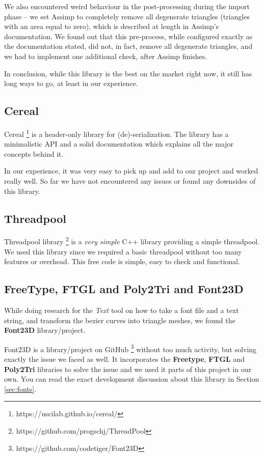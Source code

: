 We also encountered weird behaviour in the post-processing during the import phase -- we set Assimp to completely remove all degenerate triangles (triangles with an area equal to zero), which is described at length in Assimp's documentation. We found out that this pre-process, while configured exactly as the documentation stated, did not, in fact, remove all degenerate triangles, and we had to implement one additional check, after Assimp finishes.

In conclusion, while this library is the best on the market right now, it still has long ways to go, at least in our experience.

\subsection{Cereal}

Cereal \footnote{https://uscilab.github.io/cereal/} is a header-only library for (de)-serialization. The library has a minimalistic API and a solid documentation which explains all the major concepts behind it.

In our experience, it was very easy to pick up and add to our project and worked really well. So far we have not encountered any issues or found any downsides of this library.

\subsection{Threadpool}

Threadpool library \footnote{https://github.com/progschj/ThreadPool} is a \emph{very simple} C++ library providing a simple threadpool. We used this library since we required a basic threadpool without too many features or overhead. This free code is simple, easy to check and functional.

\subsection{FreeType, FTGL and Poly2Tri and Font23D}

While doing research for the \textit{Text} tool on how to take a font file and a text string, and transform the bezier curves into triangle meshes, we found the \textbf{Font23D} library/project.

Font23D is a library/project on GitHub \footnote{https://github.com/codetiger/Font23D} without too much activity, but solving exactly the issue we faced as well. It incorporates the \textbf{Freetype}, \textbf{FTGL} and \textbf{Poly2Tri} libraries to solve the issue and we used it parts of this project in our own. You can read the exact development discussion about this library in Section \ref{sec:fonts}.

